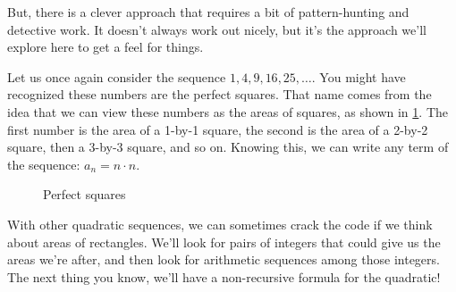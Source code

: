 But, there is a clever approach that requires a bit of pattern-hunting and detective work. It doesn't always work out nicely, but it's the approach we'll explore here to get a feel for things.

Let us once again consider the sequence $1, 4, 9, 16, 25, \dotsc$. You might have recognized these numbers are the \glspl{perfect square}. That name comes from the idea that we can view these numbers as the areas of squares, as shown in \cref{fig:perfsq}. The first number is the area of a 1-by-1 square, the second is the area of a 2-by-2 square, then a 3-by-3 square, and so on. Knowing this, we can write any term of the sequence: $a_n = n \cdot n$.

\begin{figure}
\centering
{}
\caption{Perfect squares}
\label{fig:perfsq}
\end{figure}%

With other quadratic sequences, we can sometimes crack the code if we think about areas of rectangles. We'll look for pairs of integers that could give us the areas we're after, and then look for arithmetic sequences among those integers. The next thing you know, we'll have a non-recursive formula for the quadratic!

